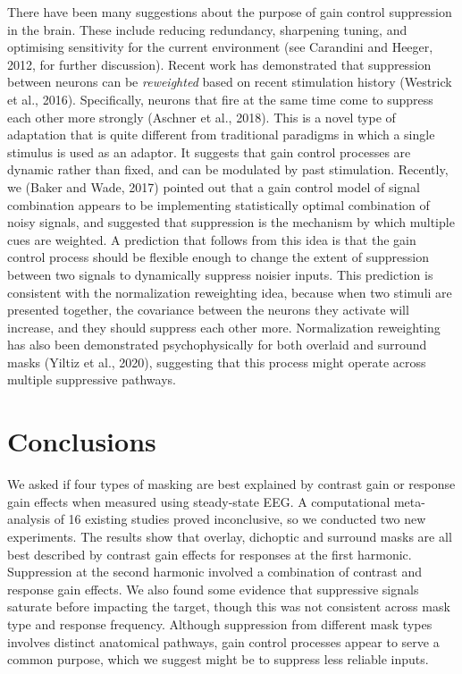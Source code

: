 \documentclass[]{article}
\begin{document}
There have been many suggestions about the purpose of gain control suppression in the brain. These include reducing redundancy, sharpening tuning, and optimising sensitivity for the current environment (see Carandini and Heeger, 2012, for further discussion). Recent work has demonstrated that suppression between neurons can be \emph{reweighted} based on recent stimulation history (Westrick et al., 2016). Specifically, neurons that fire at the same time come to suppress each other more strongly (Aschner et al., 2018). This is a novel type of adaptation that is quite different from traditional paradigms in which a single stimulus is used as an adaptor. It suggests that gain control processes are dynamic rather than fixed, and can be modulated by past stimulation. Recently, we (Baker and Wade, 2017) pointed out that a gain control model of signal combination appears to be implementing statistically optimal combination of noisy signals, and suggested that suppression is the mechanism by which multiple cues are weighted. A prediction that follows from this idea is that the gain control process should be flexible enough to change the extent of suppression between two signals to dynamically suppress noisier inputs. This prediction is consistent with the normalization reweighting idea, because when two stimuli are presented together, the covariance between the neurons they activate will increase, and they should suppress each other more. Normalization reweighting has also been demonstrated psychophysically for both overlaid and surround masks (Yiltiz et al., 2020), suggesting that this process might operate across multiple suppressive pathways.

\hypertarget{conclusions}{%
\section{Conclusions}\label{conclusions}}

We asked if four types of masking are best explained by contrast gain or response gain effects when measured using steady-state EEG. A computational meta-analysis of 16 existing studies proved inconclusive, so we conducted two new experiments. The results show that overlay, dichoptic and surround masks are all best described by contrast gain effects for responses at the first harmonic. Suppression at the second harmonic involved a combination of contrast and response gain effects. We also found some evidence that suppressive signals saturate before impacting the target, though this was not consistent across mask type and response frequency. Although suppression from different mask types involves distinct anatomical pathways, gain control processes appear to serve a common purpose, which we suggest might be to suppress less reliable inputs.
\end{document}
